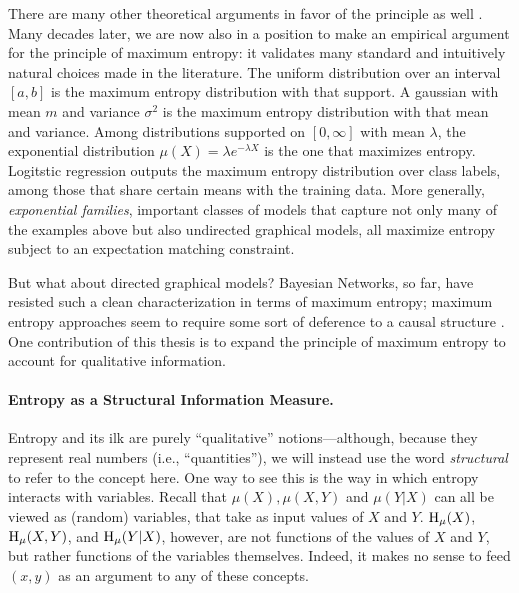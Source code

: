 {There are many other theoretical arguments in favor of the principle as well \citep{wallis}.
Many decades later, we are now also in a position to make an empirical argument for the principle of maximum entropy: it validates many standard and intuitively natural choices made in the literature.
The uniform distribution over an interval $[a,b]$ is the maximum entropy distribution with that support. 
A gaussian with mean $m$ and variance $\sigma^2$ is the maximum entropy distribution with that mean and variance. 
Among distributions supported on $[0,\infty]$ with mean $\lambda$, the exponential distribution $\mu(X) = \lambda e^{-\lambda X}$ is the one that maximizes entropy. 
Logitstic regression 
    outputs the maximum entropy distribution over class labels,
    among those that share certain means with the training data.
More generally, \emph{exponential families}, important classes of models that capture not only many of the examples above but also undirected graphical models, all maximize entropy subject to an expectation matching constraint. 

But what about directed graphical models? Bayesian Networks, so far, have resisted such a clean characterization in terms of maximum entropy; maximum entropy approaches seem to require some sort of deference to a causal structure \citep{williamson2001foundations}. 
One contribution of this thesis is to expand the principle of maximum entropy to account for qualitative information. 
%
}%


\paragraph{Entropy as a Structural Information Measure.} 
Entropy and 
its ilk
are purely ``qualitative'' notions---although, because they represent real numbers (i.e., ``quantities''), we will instead use the word \emph{structural} to refer to the concept here.
One way to see this is the way in which entropy interacts with variables. 
Recall that $\mu(X), \mu(X,Y)$ and $\mu(Y|X)$ can all be viewed as (random) variables, that take as input values of $X$ and $Y$. 
$\operatorname{\mathrm{H}}_\mu(X)$, $\operatorname{\mathrm{H}}_\mu(X,Y)$, and $\operatorname{\mathrm{H}}_\mu(Y|X)$, however, 
    are not functions of the values of $X$ and $Y$, but rather functions 
    of the variables themselves. 
Indeed, it makes no sense to feed $(x,y)$ as an argument to any of these concepts. 

